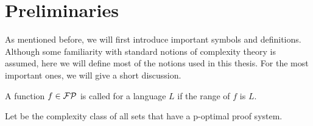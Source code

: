 \chapter{Preliminaries}
  As mentioned before, we will first introduce important symbols and definitions. Although some familiarity with standard notions of complexity theory is assumed, here we will define most of the notions used in this thesis. For the most important ones, we will give a short discussion.

  \begin{definition}
    A function \(f \in \mathcal{FP}\) is called  for a language \(L\) if the range of \(f\) is \(L\).
  \end{definition}

  \begin{definition}[OPT]
    Let  be the complexity class of all sets that have a p-optimal proof system.
  \end{definition}

